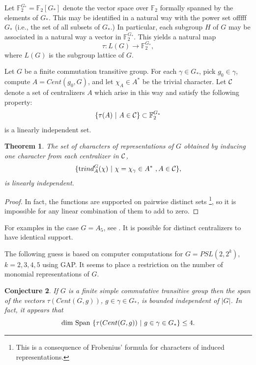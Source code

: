 \documentclass[amsfonts,12pt]{article}
\newtheorem{theorem}{Theorem}
\newtheorem{conjecture}[theorem]{Conjecture}
\def\fff{\mathbb{F}}
\begin{document}
Let $\fff_2^{G_*}=\fff_2[G_*]$ denote the vector space over $\fff_2$
formally spanned by the elements of $G_*$. This may be identified
in a natural way with the power set offfff $G_*$ (i.e., the set
of all subsets of $G_*$.) In particular, each subgroup $H$
of $G$ may be associated in a natural way a vector in $\fff_2^{G_*}$.
This yields a natural map
\begin{equation}
\tau:L(G)\rightarrow \fff_2^{G_*},
\end{equation}
where $L(G)$ is the subgroup lattice of $G$.

Let $G$ be a finite commutation transitive group.
For each $\gamma\in G_*$, pick $ g_0\in \gamma$,
compute $A = Cent(g_0,G)$, and let $\chi_A \in A^*$
be the trivial character.
Let ${\cal C}$ denote a set of centralizers $A$ which 
arise in this way and satisfy the following property:
\[
\{\tau(A)\ |\ A\in {\cal C}\}\subset \fff_2^{G_*}
\]
is a linearly independent set.

\begin{theorem} 
\label{thrm:main}
The set of characters of representations of $G$ obtained
by inducing one character from each centralizer in ${\cal C}$,
\[
\{{\rm tr} ind_A^G(\chi)\ |\ \chi=\chi_\gamma \in A^*\ , A\in {\cal C}\},
\]
is linearly independent.
\end{theorem}

\begin{proof}
In fact, the functions are supported on pairwise
distinct sets
\footnote{
This is a consequence of Frobenius' formula for characters
of induced representations.}, so it is impossible for any linear
combination of them to add to zero.

\end{proof}

For examples in the case $G=A_5$, see \cite{J2}.
It is possible for distinct centralizers to have 
identical support.

The following guess is based on computer computations for 
$G=PSL(2,2^k)$,
$k=2,3,4,5$ using GAP. It seems to place a restriction on the
number of monomial representations of $G$.

\begin{conjecture}
If $G$ is a finite simple commutative transitive group then
the span of the vectors $\tau(Cent(G,g))$, $g\in \gamma\in G_*$,
is bounded independent of $|G|$. In fact,
it appears that 
\[
{\rm dim\ Span}\ \{\tau(Cent(G,g))\ |\  g\in \gamma\in G_*\}
\leq 4.
\]
\end{conjecture}
\end{document}
